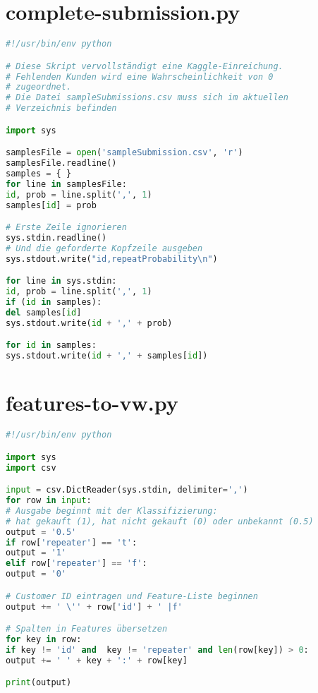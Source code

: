 \section{complete-submission.py}
\label{code:complete-submission}
\begin{lstlisting}[language=Python]
#!/usr/bin/env python

# Diese Skript vervollständigt eine Kaggle-Einreichung.
# Fehlenden Kunden wird eine Wahrscheinlichkeit von 0 
# zugeordnet.
# Die Datei sampleSubmissions.csv muss sich im aktuellen 
# Verzeichnis befinden

import sys

samplesFile = open('sampleSubmission.csv', 'r')
samplesFile.readline()
samples = { }
for line in samplesFile:
id, prob = line.split(',', 1)
samples[id] = prob

# Erste Zeile ignorieren
sys.stdin.readline()
# Und die geforderte Kopfzeile ausgeben
sys.stdout.write("id,repeatProbability\n")

for line in sys.stdin:
id, prob = line.split(',', 1)
if (id in samples):
del samples[id]
sys.stdout.write(id + ',' + prob)

for id in samples:
sys.stdout.write(id + ',' + samples[id])
\end{lstlisting}

\section{features-to-vw.py}
\label{code:features-to-vw}
\begin{lstlisting}[language=Python]
#!/usr/bin/env python

import sys
import csv

input = csv.DictReader(sys.stdin, delimiter=',')
for row in input:
# Ausgabe beginnt mit der Klassifizierung:
# hat gekauft (1), hat nicht gekauft (0) oder unbekannt (0.5)
output = '0.5'
if row['repeater'] == 't':
output = '1'
elif row['repeater'] == 'f':
output = '0'

# Customer ID eintragen und Feature-Liste beginnen
output += ' \'' + row['id'] + ' |f'

# Spalten in Features übersetzen
for key in row:
if key != 'id' and  key != 'repeater' and len(row[key]) > 0:
output += ' ' + key + ':' + row[key]

print(output)
\end{lstlisting}

